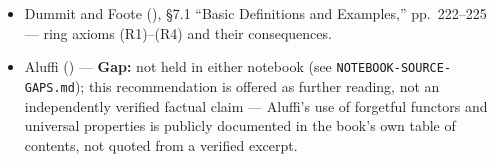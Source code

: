\begin{itemize}
\tightlist
\item
  Dummit and Foote (\cite{DummitFoote2003}), §7.1 ``Basic Definitions and Examples,'' pp.~222--225 --- ring axioms (R1)--(R4) and their consequences.
\item
  Aluffi (\cite{Aluffi2009}) --- \textbf{Gap:} not held in either notebook (see \texttt{NOTEBOOK-\allowbreak{}SOURCE-\allowbreak{}GAPS.md}); this recommendation is offered as further reading, not an independently verified factual claim --- Aluffi's use of forgetful functors and universal properties is publicly documented in the book's own table of contents, not quoted from a verified excerpt.
\end{itemize}
